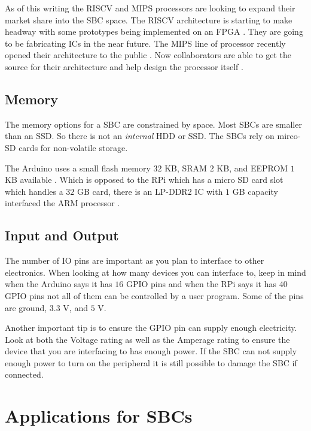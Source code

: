 As of this writing the \ac{RISCV} and \ac{MIPS} processors are looking to expand their market share into the \ac{SBC} space. The \ac{RISCV} architecture is starting to make headway with some prototypes being implemented on an \ac{FPGA} \cite{risvref}. They are going to be fabricating \ac{IC}s in the near future. The \ac{MIPS} line of processor recently opened their architecture to the public \cite{mipsopensrc}. Now collaborators are able to get the source for their architecture and help design the processor itself \cite{mipsref}.
	
\subsection{Memory}

The memory options for a \ac{SBC} are constrained by space. Most \ac{SBC}s are smaller than an \ac{SSD}. So there is not an \emph{internal} \ac{HDD} or \ac{SSD}. The \ac{SBC}s rely on mirco-\ac{SD} cards for non-volatile storage.

The Arduino uses a small flash memory $32$ \ac{KB}, \ac{SRAM} $2$ \ac{KB}, and \ac{EEPROM} $1$ \ac{KB} available \cite{arduspec}. Which is opposed to the \ac{RPi} which has a micro \ac{SD} card slot which handles a $32$ \ac{GB} card, there is an \ac{LP}-\ac{DDR}2 \ac{IC} with $1$ \ac{GB} capacity interfaced the \ac{ARM} processor \cite{rpispec}.
	
\subsection{Input and Output}

The number of \ac{IO} pins are important as you plan to interface to other electronics. When looking at how many devices you can interface to, keep in mind when the Arduino says it has $16$ \ac{GPIO} pins and when the \ac{RPi} says it has $40$ \ac{GPIO} pins not all of them can be controlled by a user program. Some of the pins are ground, $3.3$ \ac{V}, and $5$ \ac{V}.

Another important tip is to ensure the \ac{GPIO} pin can supply enough electricity. Look at both the Voltage rating as well as the Amperage rating to ensure the device that you are interfacing to has enough power. If the \ac{SBC} can not supply enough power to turn on the peripheral it is still possible to damage the \ac{SBC} if connected.
	
\section{Applications for SBCs}
	
